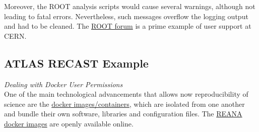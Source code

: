 \noindent
Moreover, the ROOT analysis scripts would cause several warnings, although not leading to fatal errors. Nevertheless, such messages overflow the logging output and had to be cleaned. The \href{https://root-forum.cern.ch/}{ROOT forum} is a prime example of user support at CERN.


\subsection{ATLAS RECAST Example}
\vspace{-1em}
\textit{Dealing with Docker User Permissions}\\
One of the main technological advancements that allows now reproducibility of science are the \href{https://www.docker.com/}{docker images/containers}, which are isolated from one another and bundle their own software, libraries and configuration files. The \href{https://hub.docker.com/u/reanahub}{REANA docker images} are openly available online.

